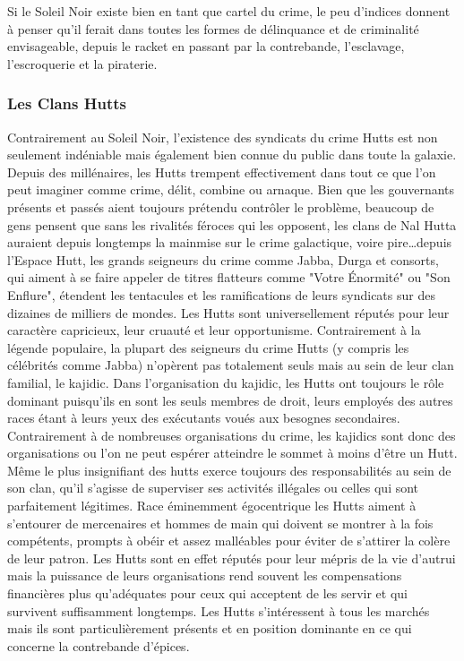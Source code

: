 \documentclass[twoside]{article}
\begin{document}
Si le Soleil Noir existe bien en tant que cartel du crime, le peu d'indices donnent à penser qu'il ferait dans toutes les formes de délinquance et de criminalité envisageable, depuis le racket en passant par la contrebande, l'esclavage, l'escroquerie et la piraterie.

\subsubsection{Les Clans Hutts}
Contrairement au Soleil Noir, l'existence des syndicats du crime Hutts est non seulement indéniable mais également bien connue du public dans toute la galaxie. Depuis des millénaires, les Hutts trempent effectivement dans tout ce que l'on peut imaginer comme crime, délit, combine ou arnaque. Bien que les gouvernants présents et passés aient toujours prétendu contrôler le problème, beaucoup de gens pensent que sans les rivalités féroces qui les opposent, les clans de Nal Hutta auraient depuis longtemps la mainmise sur le crime galactique, voire pire\ldots depuis l'Espace Hutt, les grands seigneurs du crime comme Jabba, Durga et consorts, qui aiment à se faire appeler de titres flatteurs comme "Votre Énormité" ou "Son Enflure", étendent les tentacules et les ramifications de leurs syndicats sur des dizaines de milliers de mondes. Les Hutts sont universellement réputés pour leur caractère capricieux, leur cruauté et leur opportunisme. Contrairement à la légende populaire, la plupart des seigneurs du crime Hutts (y compris les célébrités comme Jabba) n'opèrent pas totalement seuls mais au sein de leur clan familial, le kajidic. Dans l'organisation du kajidic, les Hutts ont toujours le rôle dominant puisqu'ils en sont les seuls membres de droit, leurs employés des autres races étant à leurs yeux des exécutants voués aux besognes secondaires. Contrairement à de nombreuses organisations du crime, les kajidics sont donc des organisations ou l'on ne peut espérer atteindre le sommet à moins d'être un Hutt. Même le plus insignifiant des hutts exerce toujours des responsabilités au sein de son clan, qu'il s'agisse de superviser ses activités illégales ou celles qui sont parfaitement légitimes. Race éminemment égocentrique les Hutts aiment à s'entourer de mercenaires et hommes de main qui doivent se montrer à la fois compétents, prompts à obéir et assez malléables pour éviter de s'attirer la colère de leur patron. Les Hutts sont en effet réputés pour leur mépris de la vie d'autrui mais la puissance de leurs organisations rend souvent les compensations financières plus qu'adéquates pour ceux qui acceptent de les servir et qui survivent suffisamment longtemps. Les Hutts s'intéressent à tous les marchés mais ils sont particulièrement présents et en position dominante en ce qui concerne la contrebande d'épices.
\end{document}
